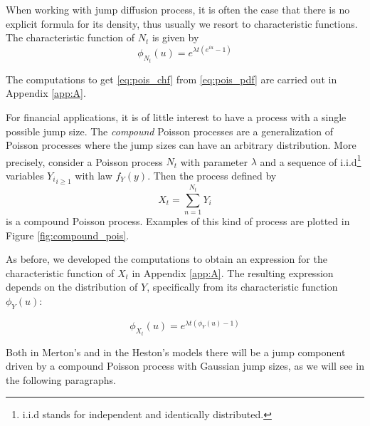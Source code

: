 When working with jump diffusion process, it is often the case that there is no explicit formula for its density, thus usually we resort to characteristic functions. The characteristic function of $N_t$ is given by 
\begin{equation}
\label{eq:pois_chf}
	\phi_{N_t}(u)=e^{\lambda t (e^{iu}-1)}
\end{equation}

The computations to get \ref{eq:pois_chf} from \ref{eq:pois_pdf} are carried out in Appendix \ref{app:A}. 

\bigskip
For financial applications, it is of little interest to have a process with a single possible jump size. The \textit{compound} Poisson processes are a generalization of Poisson processes  where  the jump sizes can have an arbitrary distribution. More precisely, consider a Poisson process $N_t$ with parameter $\lambda$ and a sequence of i.i.d\footnote{i.i.d stands for independent and identically distributed.} variables ${Y_i}_{i\geq 1}$ with law $f_Y(y)$. Then the process defined by
\begin{equation}
	X_t = \sum_{n=1}^{N_t} Y_i
\end{equation}
is a compound Poisson process. Examples of this kind of process are plotted in Figure \cref{fig:compound_pois}.

As before, we developed the computations to obtain an expression for the characteristic function of $X_t$ in Appendix \ref{app:A}. The resulting expression depends on the distribution of $Y$, specifically from its characteristic function $\phi_Y(u)$:

\begin{equation}
	\phi_{X_t}(u) = e^{\lambda t (\phi_Y(u)-1)}
\end{equation}

Both in Merton's and in the Heston's models there will be a jump component driven by a compound Poisson process with Gaussian jump sizes, as we will see in the following paragraphs.


